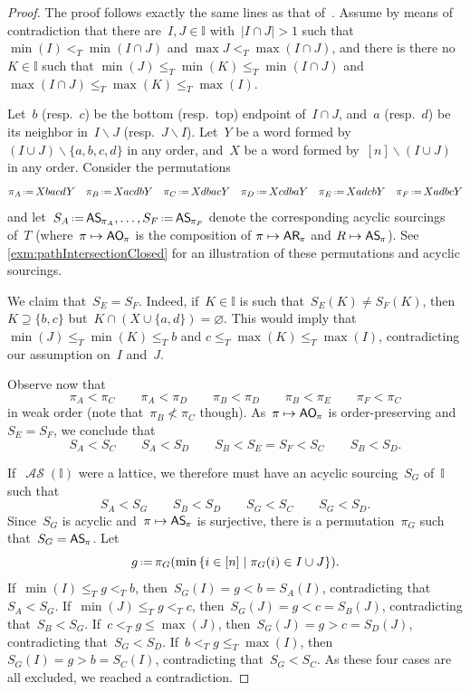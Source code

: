 \documentclass{amsart}
\theoremstyle{definition}
\newcommand{\set}[2]{\left\{ #1 \;\middle|\; #2 \right\}} %
\newcommand{\ssm}{\smallsetminus} %
\newcommand{\eqdef}{\mbox{\,\raisebox{0.2ex}{\scriptsize\ensuremath{\mathrm:}}\ensuremath{=}\,}} %
\newcommand{\mymap}[2]{\mathsf{#1}_{\hspace{-.7pt}#2}}
\newcommand{\aorn}[1]{\mymap{AO}{#1}}  %
\newcommand{\areori}[1]{\mymap{AR}{#1}}  %
\DeclareMathOperator{\ASour}{\mathcal{AS}}  %
\newcommand{\asour}[1]{\mymap{AS}{#1}}  %
\newcommand{\II}{\mathbb I} %
\begin{document}
\begin{proof}
The proof follows exactly the same lines as that of~\cite[Prop.~4.6]{BergeronPilaud}.
Assume by means of contradiction that there are~$I,J\in \II$ with~$|I\cap J|> 1$ such that $\min(I) <_T \min(I\cap J)$ and  $\max J <_T \max (I\cap J)$, and there is there no~$K \in \II$ such that $\min(J) \le_T \min(K) \le_T \min(I\cap J)$ and ${\max(I\cap J) \le_T \max(K) \le_T \max(I)}$.

Let~$b$ (resp.~$c$) be the bottom (resp.~top) endpoint of~$I \cap J$, and~$a$ (resp.~$d$) be its neighbor in~$I \ssm J$ (resp.~$J \ssm I$).
Let~$Y$ be a word formed by~$(I \cup J) \ssm \{a,b,c,d\}$ in any order, and~$X$ be a word formed by~$[n] \ssm (I \cup J)$ in any order.
Consider the permutations
\[
\pi_A \eqdef XbacdY
\quad
\pi_B \eqdef XacdbY
\quad
\pi_C \eqdef XdbacY
\quad
\pi_D \eqdef XcdbaY
\quad
\pi_E \eqdef XadcbY
\quad
\pi_F \eqdef XadbcY
\]
and let~$S_A \eqdef \asour{\pi_A}, \dots, S_F \eqdef \asour{\pi_F}$ denote the corresponding acyclic sourcings of~$T$ (where~${\pi \mapsto \aorn{\pi}}$ is the composition of $\pi \mapsto \areori{\pi}$ and $R \mapsto \asour{\pi}$).
See \cref{exm:pathIntersectionClosed} for an illustration of these permutations and acyclic sourcings.

We claim that~$S_E = S_F$.
Indeed, if~$K \in \II$ is such that~$S_E(K) \ne S_F(K)$, then~$K \supseteq \{b,c\}$ but~$K \cap (X \cup \{a,d\}) = \varnothing$.
This would imply that~$\min(J) \le_T \min(K) \le_T b$ and $c \le_T \max(K) \le_T \max(I)$, contradicting our assumption on~$I$ and~$J$.

Observe now that
\[
\pi_A < \pi_C
\qquad
\pi_A < \pi_D
\qquad
\pi_B < \pi_D
\qquad
\pi_B < \pi_E
\qquad
\pi_F < \pi_C
\]
in weak order (note that~$\pi_B \not< \pi_C$ though).
As~$\pi \mapsto \aorn{\pi}$ is order-preserving and~$S_E = S_F$, we conclude that
\[
S_A < S_C
\qquad
S_A < S_D
\qquad
S_B < S_E = S_F < S_C
\qquad
S_B < S_D.
\]

If~$\ASour(\II)$ were a lattice, we therefore must have an acyclic sourcing~$S_G$ of~$\II$ such that
\[
S_A < S_G
\qquad
S_B < S_D
\qquad
S_G < S_C
\qquad
S_G < S_D.
\]
Since~$S_G$ is acyclic and~$\pi \mapsto \asour{\pi}$ is surjective, there is a permutation~$\pi_G$ such that~$S_G = \asour{\pi}$.
Let
\[
g \eqdef \pi_G(\min\set{i \in [n]}{\pi_G(i) \in I \cup J}).
\]
If~$\min(I) \le_T g <_T b$, then~$S_G(I) = g < b = S_A(I)$, contradicting that~$S_A < S_G$.
If~$\min(J) \le_T g <_T c$, then~$S_G(J) = g < c = S_B(J)$, contradicting that~$S_B < S_G$.
If~$c <_T g \le \max(J)$, then~$S_G(J) = g > c = S_D(J)$, contradicting that~$S_G < S_D$.
If~$b <_T g \le_T \max(I)$, then~$S_G(I) = g > b = S_C(I)$, contradicting that~$S_G < S_C$.
As these four cases are all excluded, we reached a contradiction.
\end{proof}
\end{document}
